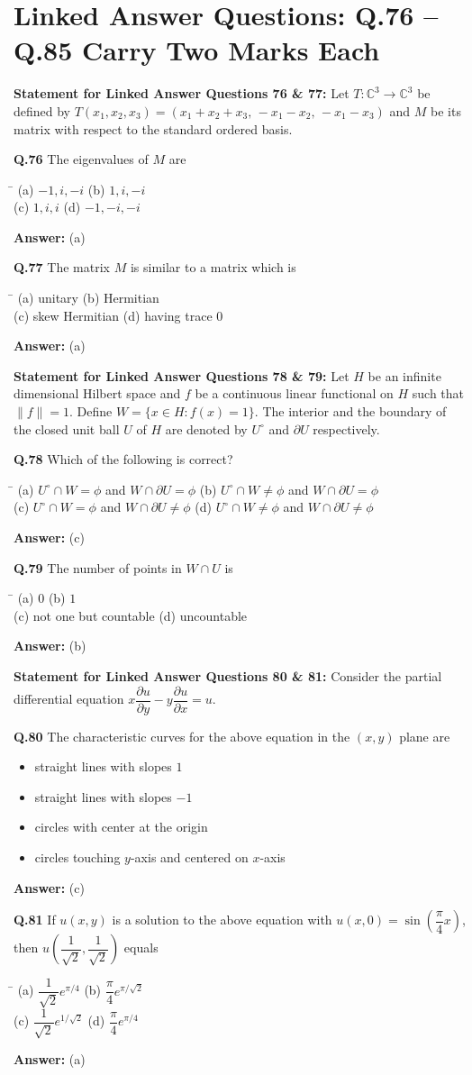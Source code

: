 \documentclass[11pt,a4paper]{article}
\newcommand{\optsfour}[4]{%
  \begin{tabbing}
    \hspace{0.48\linewidth}\=\kill
    (a) #1 \> (b) #2 \\[2pt]
    (c) #3 \> (d) #4
  \end{tabbing}%
}
\newcommand{\optslist}[4]{%
  \begin{itemize}
    \setlength{\itemsep}{2pt}\setlength{\parskip}{0pt}
    \item[(a)] #1
    \item[(b)] #2
    \item[(c)] #3
    \item[(d)] #4
  \end{itemize}%
}
\newcommand{\ans}[1]{\textbf{Answer:} #1\par\medskip}
\begin{document}
\section*{Linked Answer Questions: Q.76 -- Q.85 Carry Two Marks Each}

\textbf{Statement for Linked Answer Questions 76 \& 77:}
Let $T : \mathbb{C}^3 \to \mathbb{C}^3$ be defined by $T(x_1, x_2, x_3) = (x_1 + x_2 + x_3,\, -x_1 - x_2,\, -x_1 - x_3)$ and $M$ be its matrix with respect to the standard ordered basis.

\textbf{Q.76} The eigenvalues of $M$ are
\optsfour{$-1, i, -i$}{$1, i, -i$}{$1, i, i$}{$-1, -i, -i$}
\ans{(a)}

\textbf{Q.77} The matrix $M$ is similar to a matrix which is
\optsfour{unitary}{Hermitian}{skew Hermitian}{having trace $0$}
\ans{(a)}

\medskip
\textbf{Statement for Linked Answer Questions 78 \& 79:}
Let $H$ be an infinite dimensional Hilbert space and $f$ be a continuous linear functional on $H$ such that $\|f\| = 1$. Define $W = \{x \in H : f(x) = 1\}$. The interior and the boundary of the closed unit ball $U$ of $H$ are denoted by $U^\circ$ and $\partial U$ respectively.

\textbf{Q.78} Which of the following is correct?
\optsfour{$U^\circ \cap W = \phi$ and $W \cap \partial U = \phi$}{$U^\circ \cap W \ne \phi$ and $W \cap \partial U = \phi$}{$U^\circ \cap W = \phi$ and $W \cap \partial U \ne \phi$}{$U^\circ \cap W \ne \phi$ and $W \cap \partial U \ne \phi$}
\ans{(c)}

\textbf{Q.79} The number of points in $W \cap U$ is
\optsfour{$0$}{$1$}{not one but countable}{uncountable}
\ans{(b)}

\medskip
\textbf{Statement for Linked Answer Questions 80 \& 81:}
Consider the partial differential equation $x\dfrac{\partial u}{\partial y} - y\dfrac{\partial u}{\partial x} = u$.

\textbf{Q.80} The characteristic curves for the above equation in the $(x, y)$ plane are
\optslist{straight lines with slopes $1$}{straight lines with slopes $-1$}{circles with center at the origin}{circles touching $y$-axis and centered on $x$-axis}
\ans{(c)}

\textbf{Q.81} If $u(x, y)$ is a solution to the above equation with $u(x, 0) = \sin\!\left(\dfrac{\pi}{4}x\right)$, then $u\!\left(\dfrac{1}{\sqrt{2}}, \dfrac{1}{\sqrt{2}}\right)$ equals
\optsfour{$\dfrac{1}{\sqrt{2}}e^{\pi/4}$}{$\dfrac{\pi}{4}e^{\pi/\sqrt{2}}$}{$\dfrac{1}{\sqrt{2}}e^{1/\sqrt{2}}$}{$\dfrac{\pi}{4}e^{\pi/4}$}
\ans{(a)}
\end{document}
